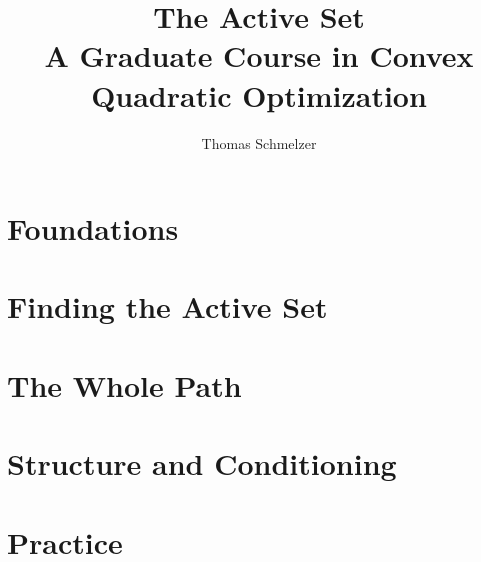 \documentclass[11pt,openany]{book}
\title{\Huge The Active Set\\[0.4em]
       \Large A Graduate Course in Convex Quadratic Optimization}
\author{Thomas Schmelzer}
\date{}
\theoremstyle{plain}
\theoremstyle{definition}
\theoremstyle{remark}
\begin{document}
\frontmatter
\maketitle
\tableofcontents


\mainmatter

\part{Foundations}





\part{Finding the Active Set}




\part{The Whole Path}




\part{Structure and Conditioning}




\part{Practice}



\appendix




\backmatter
{\footnotesize


}
\printindex
\end{document}
